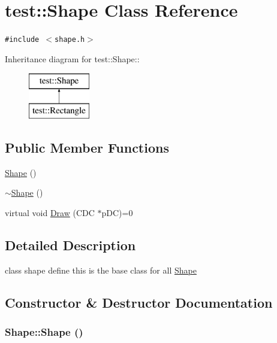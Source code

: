 \hypertarget{classtest_1_1Shape}{
\section{test::Shape Class Reference}
\label{classtest_1_1Shape}
}
{\tt \#include $<$shape.h$>$}

Inheritance diagram for test::Shape::\begin{figure}[H]
\begin{center}
\leavevmode
\includegraphics[height=2cm]{classtest_1_1Shape}
\end{center}
\end{figure}
\subsection*{Public Member Functions}
\begin{CompactItemize}
\item 
\hyperlink{classtest_1_1Shape_aa8d87171e65e0d8ba3c5459978992a7}{Shape} ()
\item 
\hyperlink{classtest_1_1Shape_935afc9e576015f967d90de56977167d}{$\sim$Shape} ()
\item 
virtual void \hyperlink{classtest_1_1Shape_71718b8d8832ba737879df3d78b22204}{Draw} (CDC $\ast$pDC)=0
\end{CompactItemize}


\subsection{Detailed Description}
class shape define this is the base class for all \hyperlink{classtest_1_1Shape}{Shape} 

\subsection{Constructor \& Destructor Documentation}
\hypertarget{classtest_1_1Shape_aa8d87171e65e0d8ba3c5459978992a7}{
\subsubsection[Shape]{\setlength{\rightskip}{0pt plus 5cm}Shape::Shape ()}}
\label{classtest_1_1Shape_aa8d87171e65e0d8ba3c5459978992a7}



